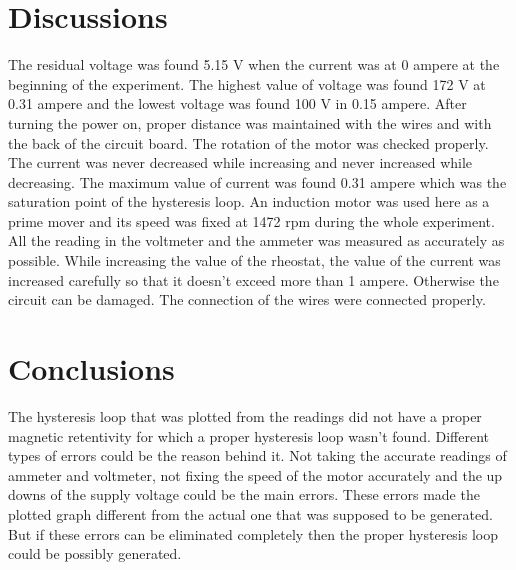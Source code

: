 \FloatBarrier
\section{Discussions}
The residual voltage was found 5.15 V when the current was at 0 ampere at the beginning of the experiment. The highest value of voltage was found 172 V at 0.31 ampere and the lowest voltage was found 100 V in 0.15 ampere. After turning the power on, proper distance was maintained with the wires and with the back of the circuit board. The rotation of the motor was checked properly. The current was never decreased while increasing and never increased while decreasing. The maximum value of current was found 0.31 ampere which was the saturation point of the hysteresis loop. An induction motor was used here as a prime mover and its speed was fixed at 1472 rpm during the whole experiment. All the reading in the voltmeter and the ammeter was measured as accurately as possible. While increasing the value of the rheostat, the value of the current was increased carefully so that it doesn't exceed more than 1 ampere. Otherwise the circuit can be damaged. The connection of the wires were connected properly.

\section{Conclusions}
The hysteresis loop that was plotted from the readings did not have a proper magnetic  retentivity for which a proper hysteresis loop wasn't found. Different types of errors could be the reason behind it. Not taking the accurate readings of ammeter and voltmeter, not fixing the speed of the motor accurately and the up downs of the supply voltage could be the main errors. These errors made the plotted graph different from the actual one that was supposed to be generated. But if these errors can be eliminated completely then the proper hysteresis loop could be possibly generated. 


%  
% 



